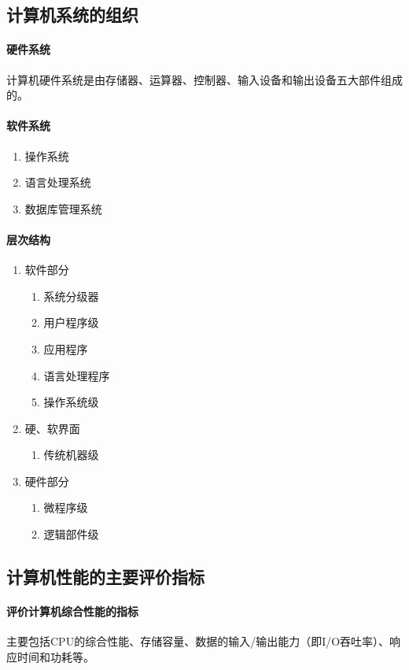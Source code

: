 \documentclass[a4paper, 12pt, oneside]{ctexart}
\begin{document}
	\subsection{计算机系统的组织}
	\paragraph{硬件系统}
	计算机硬件系统是由存储器、运算器、控制器、输入设备和输出设备五大部件组成的。
	\paragraph{软件系统}
	\begin{enumerate}
		\item 操作系统
		\item 语言处理系统
		\item 数据库管理系统
	\end{enumerate}
	\paragraph{层次结构}
	\begin{enumerate}
		\item 软件部分
			\begin{enumerate}
				\item 系统分级器
				\item 用户程序级
				\item 应用程序
				\item 语言处理程序
				\item 操作系统级
			\end{enumerate} 	
		\item 硬、软界面 
				\begin{enumerate}
					\item 传统机器级
				\end{enumerate}
		\item 硬件部分 
			\begin{enumerate}
				\item 微程序级
				\item 逻辑部件级
			\end{enumerate}
	\end{enumerate}
	\subsection{计算机性能的主要评价指标}
	\paragraph{评价计算机综合性能的指标}
	主要包括CPU的综合性能、存储容量、数据的输入/输出能力（即I/O吞吐率）、响应时间和功耗等。
\end{document}
